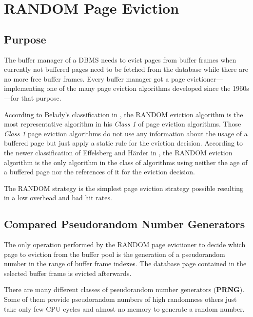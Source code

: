 \chapter[RANDOM Page Eviction]{RANDOM Page Eviction} \label{ch:random}

\section[Purpose]{Purpose}

	The buffer manager of a DBMS needs to evict pages from buffer frames when currently not buffered pages need to be fetched from the database while there are no more free buffer frames. Every buffer manager got a page evictioner---implementing one of the many page eviction algorithms developed since the 1960s---for that purpose.
	
	According to Belady's classification in \cite{Belady:1966}, the RANDOM eviction algorithm is the most representative algorithm in his \textit{Class 1} of page eviction algorithms. Those \textit{Class 1} page eviction algorithms do not use any information about the usage of a buffered page but just apply a static rule for the eviction decision. According to the newer classification of Effelsberg and Härder in \cite{Effelsberg:1984}, the RANDOM eviction algorithm is the only algorithm in the class of algorithms using neither the age of a buffered page nor the references of it for the eviction decision.
	
	The RANDOM strategy is the simplest page eviction strategy possible resulting in a low overhead and bad hit rates.

\section[Compared Pseudorandom Number Generators]{Compared Pseudorandom Number Generators}

	The only operation performed by the RANDOM page evictioner to decide which page to eviction from the buffer pool is the generation of a pseudorandom number in the range of buffer frame indexes. The database page contained in the selected buffer frame is evicted afterwards.
	
	There are many different classes of pseudorandom number generators (\textbf{PRNG}). Some of them provide pseudorandom numbers of high randomness others just take only few CPU cycles and almost no memory to generate a random number.
	


